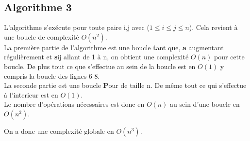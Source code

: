 	
  \subsection{Algorithme 3}
  
	L'algorithme s'exécute pour toute paire i,j avec ($ 1 \leq i \leq j \leq n$). Cela revient à une boucle de complexité $O(n^2)$.\\

	La première partie de l'algorithme est une boucle {\textbf tant que}, {\textbf a} augmentant régulièrement et {\textbf sij } allant de 1 à n, on obtient une complexité $O(n)$ pour cette boucle. De plus tout ce que s'effectue au sein de la boucle est en $O(1)$ y compris la boucle des lignes 6-8.\\

	La seconde partie est une boucle {\textbf Pour } de taille n. De même tout ce qui s'effectue à l'interieur est en $O(1)$.\\
	
	Le nombre d'opérations nécessaires est donc en $O(n)$ au sein d'une boucle en $O(n^2)$.
	
	On a donc une complexité globale en $O(n^3)$.
	